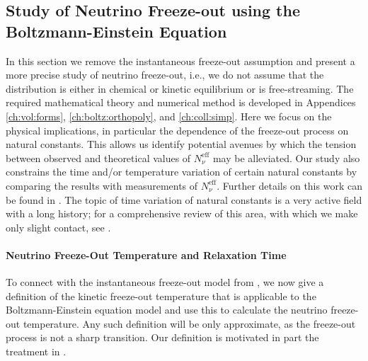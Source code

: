 \subsection{Study of Neutrino Freeze-out using  the Boltzmann-Einstein Equation}\label{ch:param:studies}
In this section we remove the instantaneous freeze-out assumption  and present a more precise study of  neutrino freeze-out, i.e., we do not assume that the distribution is either in chemical or kinetic equilibrium or is free-streaming.
The required mathematical theory and numerical method is developed in Appendices \ref{ch:vol:forms}, \ref{ch:boltz:orthopoly}, and \ref{ch:coll:simp}.  Here we focus on the physical implications, in particular the dependence of the freeze-out process on natural constants. This allows us identify potential avenues by which the tension between observed and theoretical values of $N^{\mathrm{eff}}_\nu$ may be alleviated.   Our study also constrains the time and/or temperature variation of certain natural constants by comparing the results with measurements of $N_\nu^{\mathrm{eff}}$. Further details on this work can be found in \cite{Birrell:2014uka}. The topic of time variation of natural constants is a very active field with a long history; for a comprehensive review of this area, with which we make only slight contact,  see \cite{Uzan:2010pm}.  

\paragraph{Neutrino Freeze-Out Temperature and Relaxation Time} 
To connect with the instantaneous freeze-out model from , we now give a definition of the kinetic freeze-out temperature that is applicable to the Boltzmann-Einstein equation model and use this to calculate the neutrino freeze-out temperature. Any such definition will be only approximate, as the freeze-out process is not a sharp transition.  Our definition is motivated in part the treatment in \cite{Kolb:1990vq}. 

